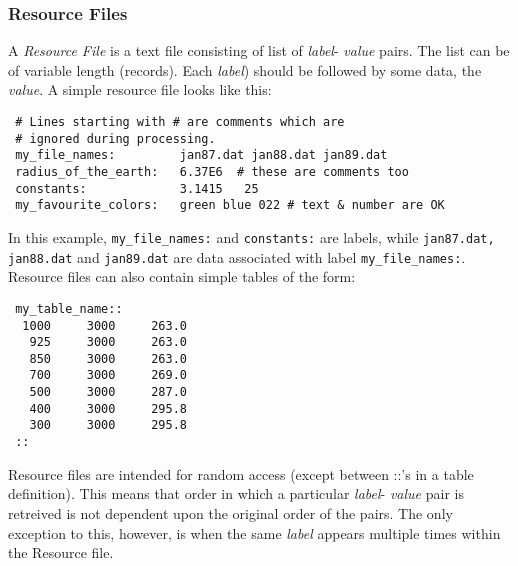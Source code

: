 
 \subsubsection{Resource Files}

   A {\em Resource File} is a text file consisting of list of {\em label}- 
   {\em value} pairs. The list can be of variable length (records).
   Each {\em label}) should be followed by some data, the {\em value}. 
   A simple resource file looks like this:

 \begin{verbatim}
 # Lines starting with # are comments which are
 # ignored during processing.
 my_file_names:         jan87.dat jan88.dat jan89.dat
 radius_of_the_earth:   6.37E6  # these are comments too
 constants:             3.1415   25
 my_favourite_colors:   green blue 022 # text & number are OK
 \end{verbatim}

    In this example, {\tt my\_file\_names:} and {\tt constants:}
    are labels, while {\tt jan87.dat, jan88.dat} and {\tt jan89.dat} are
    data associated with label {\tt my\_file\_names:}.
    Resource files can also contain simple tables of the form:

 \begin{verbatim}
 my_table_name::
  1000     3000     263.0   
   925     3000     263.0
   850     3000     263.0
   700     3000     269.0
   500     3000     287.0
   400     3000     295.8
   300     3000     295.8    
 ::
 \end{verbatim}

 Resource files are intended for random access (except between ::'s in a 
 table definition). This means that order in which a particular {\em label}- 
 {\em value} pair is retreived is not dependent upon the original order 
 of the pairs. The only exception to this, however, is when the same {\em label} appears 
 multiple times within the Resource file.




